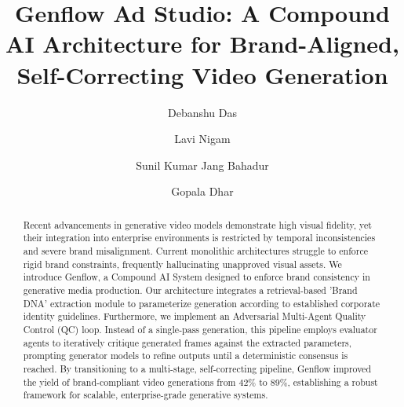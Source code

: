 \documentclass[sigconf,authordraft]{acmart}
\begin{document}
\title{Genflow Ad Studio: A Compound AI Architecture for Brand-Aligned, Self-Correcting Video Generation}

\author{Debanshu Das}
\affiliation{%
  \institution{}
  \country{}
}

\author{Lavi Nigam}
\affiliation{%
  \institution{}
  \country{}
}

\author{Sunil Kumar Jang Bahadur}
\affiliation{%
  \institution{}
  \country{}
}

\author{Gopala Dhar}
\affiliation{%
  \institution{}
  \country{}
}

\renewcommand{\shortauthors}{Das, Nigam, Jang Bahadur, and Dhar}

\begin{abstract}
Recent advancements in generative video models demonstrate high visual fidelity, yet their integration into enterprise environments is restricted by temporal inconsistencies and severe brand misalignment. Current monolithic architectures struggle to enforce rigid brand constraints, frequently hallucinating unapproved visual assets. We introduce Genflow, a Compound AI System designed to enforce brand consistency in generative media production. Our architecture integrates a retrieval-based 'Brand DNA' extraction module to parameterize generation according to established corporate identity guidelines. Furthermore, we implement an Adversarial Multi-Agent Quality Control (QC) loop. Instead of a single-pass generation, this pipeline employs evaluator agents to iteratively critique generated frames against the extracted parameters, prompting generator models to refine outputs until a deterministic consensus is reached. By transitioning to a multi-stage, self-correcting pipeline, Genflow improved the yield of brand-compliant video generations from 42\% to 89\%, establishing a robust framework for scalable, enterprise-grade generative systems.
\end{abstract}
\end{document}
